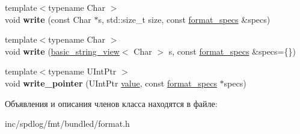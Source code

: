\begin{DoxyCompactItemize}
\item 
\mbox{\label{classinternal_1_1basic__writer_ae7f441bc88f775af48c369dca0ea4074}} 
{\footnotesize template$<$typename Char $>$ }\\void {\bfseries write} (const Char $\ast$s, std\+::size\+\_\+t size, const \hyperlink{structbasic__format__specs}{format\+\_\+specs} \&specs)
\item 
\mbox{\label{classinternal_1_1basic__writer_a806daf859e6802d7262de4141309a3e6}} 
{\footnotesize template$<$typename Char $>$ }\\void {\bfseries write} (\hyperlink{classbasic__string__view}{basic\+\_\+string\+\_\+view}$<$ Char $>$ s, const \hyperlink{structbasic__format__specs}{format\+\_\+specs} \&specs=\{\})
\item 
\mbox{\label{classinternal_1_1basic__writer_a4c72b2c1dfabc0feddee120e250f59f2}} 
{\footnotesize template$<$typename U\+Int\+Ptr $>$ }\\void {\bfseries write\+\_\+pointer} (U\+Int\+Ptr \hyperlink{classinternal_1_1value}{value}, const \hyperlink{structbasic__format__specs}{format\+\_\+specs} $\ast$specs)
\end{DoxyCompactItemize}


Объявления и описания членов класса находятся в файле\+:\begin{DoxyCompactItemize}
\item 
inc/spdlog/fmt/bundled/format.\+h\end{DoxyCompactItemize}
